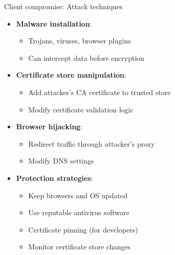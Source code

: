 \documentclass[aspectratio=169, lualatex, handout]{beamer}
\begin{document}
\begin{frame}{Client compromise: Attack techniques}
	\begin{itemize}
		\item \textbf{Malware installation}:
		      \begin{itemize}
			      \item Trojans, viruses, browser plugins
			      \item Can intercept data before encryption
		      \end{itemize}
		\item \textbf{Certificate store manipulation}:
		      \begin{itemize}
			      \item Add attacker's CA certificate to trusted store
			      \item Modify certificate validation logic
		      \end{itemize}
		\item \textbf{Browser hijacking}:
		      \begin{itemize}
			      \item Redirect traffic through attacker's proxy
			      \item Modify DNS settings
		      \end{itemize}
		\item \textbf{Protection strategies}:
		      \begin{itemize}
			      \item Keep browsers and OS updated
			      \item Use reputable antivirus software
			      \item Certificate pinning (for developers)
			      \item Monitor certificate store changes
		      \end{itemize}
	\end{itemize}
\end{frame}
\end{document}
